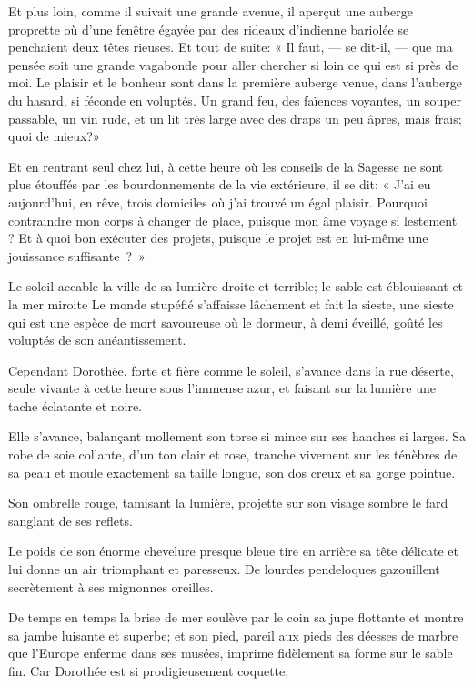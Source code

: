 Et plus loin, comme il suivait une grande avenue, il aperçut une auberge
proprette où d’une fenêtre égayée par des rideaux
d’indienne bariolée se penchaient deux têtes rieuses.
Et tout de suite: « Il faut, --- se dit{}-il, --- que ma pensée soit une
grande vagabonde pour aller chercher si loin ce qui est si près de moi.
Le plaisir et le bonheur sont dans la première auberge venue, dans
l’auberge du hasard, si féconde en voluptés. Un grand
feu, des faïences voyantes, un souper passable, un vin rude, et un lit
très large avec des draps un peu âpres, mais frais; quoi de mieux?»

Et en rentrant seul chez lui, à cette heure où les conseils de la
Sagesse ne sont plus étouffés par les bourdonnements de la vie
extérieure, il se dit: « J’ai eu
aujourd’hui, en rêve, trois domiciles où
j’ai trouvé un égal plaisir. Pourquoi contraindre mon
corps à changer de place, puisque mon âme voyage si lestement ? Et à
quoi bon exécuter des projets, puisque le projet est en lui{}-même une
jouissance \mbox{suffisante ? »}


Le soleil accable la ville de sa lumière droite et terrible; le sable
est éblouissant et la mer miroite Le monde stupéfié
s’affaisse lâchement et fait la sieste, une sieste qui
est une espèce de mort savoureuse où le dormeur, à demi éveillé, goûté
les voluptés de son anéantissement.

Cependant Dorothée, forte et fière comme le soleil,
s’avance dans la rue déserte, seule vivante à cette
heure sous l’immense azur, et faisant sur la lumière
une tache éclatante et noire.

Elle s’avance, balançant mollement son torse si mince
sur ses hanches si larges. Sa robe de soie collante,
d’un ton clair et rose, tranche vivement sur les
ténèbres de sa peau et moule exactement sa taille longue, son dos creux
et sa gorge pointue.

Son ombrelle rouge, tamisant la lumière, projette sur son visage sombre
le fard sanglant de ses reflets.

Le poids de son énorme chevelure presque bleue tire en arrière sa tête
délicate et lui donne un air triomphant et paresseux. De lourdes
pendeloques gazouillent secrètement à ses mignonnes oreilles.

De temps en temps la brise de mer soulève par le coin sa jupe flottante
et montre sa jambe luisante et superbe; et son pied, pareil aux pieds
des déesses de marbre que l’Europe enferme dans ses
musées, imprime fidèlement sa forme sur le sable fin. Car Dorothée est
si prodigieusement coquette,

